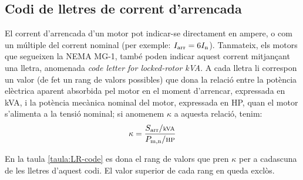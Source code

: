 \subsection{Codi de lletres de corrent d'arrencada}

El corrent d'arrencada d'un motor pot indicar-se directament en ampere, o com un múltiple del corrent nominal (per exemple: $I_\mathrm{arr} = 6 I_\mathrm{n}$). Tanmateix, els motors que segueixen la NEMA MG-1, també poden indicar aquest corrent mitjançant una lletra, anomenada \textit{code letter for locked-rotor kVA}. A cada lletra li correspon un valor (de fet un rang de valors possibles) que dona la relació entre la potència elèctrica aparent absorbida pel motor en el moment d'arrencar, expressada en kVA, i la potència mecànica nominal del motor, expressada en HP, quan el motor s'alimenta a la tensió nominal; si anomenem $\kappa$ a aquesta relació, tenim:
\begin{equation}
    \kappa = \frac{S\ped{arr}/{\scriptstyle\unit{kVA}}}{P\ped{m,n}/{\scriptstyle \unit{HP}}}
\end{equation}

En la taula \vref{taula:LR-code} es dona el rang de valors que pren $\kappa$ per a cadascuna de les lletres d'aquest codi. El valor superior de cada rang en queda exclòs.

